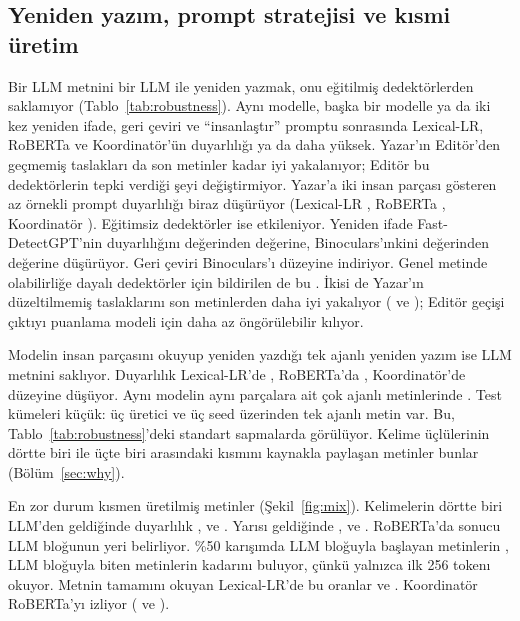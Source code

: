 \documentclass[journal]{IEEEtran}
\begin{document}

\subsection{Yeniden yazım, prompt stratejisi ve kısmi üretim}
Bir LLM metnini bir LLM ile yeniden yazmak, onu eğitilmiş dedektörlerden saklamıyor (Tablo~\ref{tab:robustness}).
Aynı modelle, başka bir modelle ya da iki kez yeniden ifade, geri çeviri ve ``insanlaştır'' promptu sonrasında
Lexical-LR, RoBERTa ve Koordinatör'ün duyarlılığı \RecBacktranslateTrans{} ya da daha yüksek. Yazar'ın Editör'den
geçmemiş taslakları da son metinler kadar iyi yakalanıyor; Editör bu dedektörlerin tepki verdiği şeyi
değiştirmiyor. Yazar'a iki insan parçası gösteren az örnekli prompt duyarlılığı biraz düşürüyor (Lexical-LR
\RecPromptFewshotLexlr{}, RoBERTa \RecPromptFewshotTrans{}, Koordinatör \RecPromptFewshotCoord{}). Eğitimsiz
dedektörler ise etkileniyor. Yeniden ifade Fast-DetectGPT'nin duyarlılığını \RecBaseParaphraseSelfFast{} değerinden
\RecParaphraseSelfFast{} değerine, Binoculars'ınkini \RecBaseParaphraseSelfBino{} değerinden
\RecParaphraseSelfBino{} değerine düşürüyor. Geri çeviri Binoculars'ı \RecBacktranslateBino{} düzeyine indiriyor.
Genel metinde olabilirliğe dayalı dedektörler için bildirilen de bu \cite{Krishna_2023}. İkisi de Yazar'ın
düzeltilmemiş taslaklarını son metinlerden daha iyi yakalıyor (\RecWriterOnlyFast{} ve \RecWriterOnlyBino{});
Editör geçişi çıktıyı puanlama modeli için daha az öngörülebilir kılıyor.

Modelin insan parçasını okuyup yeniden yazdığı tek ajanlı yeniden yazım ise LLM metnini saklıyor. Duyarlılık
Lexical-LR'de \RecSingleLexlr{}, RoBERTa'da \RecSingleTrans{}, Koordinatör'de \RecSingleCoord{} düzeyine düşüyor.
Aynı modelin aynı parçalara ait çok ajanlı metinlerinde \RecBaseSingleLexlr{}. Test kümeleri küçük: üç üretici ve
üç seed üzerinden \NSingleTest{} tek ajanlı metin var. Bu, Tablo~\ref{tab:robustness}'deki standart sapmalarda
görülüyor. Kelime üçlülerinin dörtte biri ile üçte biri arasındaki kısmını kaynakla paylaşan metinler bunlar
(Bölüm~\ref{sec:why}).

En zor durum kısmen üretilmiş metinler (Şekil~\ref{fig:mix}). Kelimelerin dörtte biri LLM'den geldiğinde duyarlılık
\RecMixTwoFiveLexlr{}, \RecMixTwoFiveTrans{} ve \RecMixTwoFiveCoord{}. Yarısı geldiğinde \RecMixFiveZeroLexlr{},
\RecMixFiveZeroTrans{} ve \RecMixFiveZeroCoord{}. RoBERTa'da sonucu LLM bloğunun yeri belirliyor. \%50 karışımda LLM
bloğuyla başlayan metinlerin \PosMixFiveZeroFirstTrans{}, LLM bloğuyla biten metinlerin \PosMixFiveZeroLastTrans{}
kadarını buluyor, çünkü yalnızca ilk 256 tokenı okuyor. Metnin tamamını okuyan Lexical-LR'de bu oranlar
\PosMixFiveZeroFirstLexlr{} ve \PosMixFiveZeroLastLexlr{}. Koordinatör RoBERTa'yı izliyor
(\PosMixFiveZeroFirstCoord{} ve \PosMixFiveZeroLastCoord{}).
\end{document}
